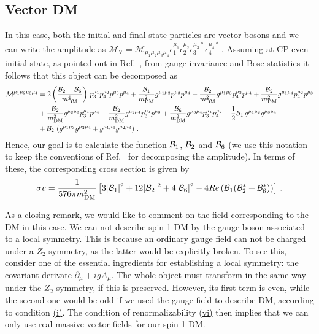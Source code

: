 \subsection{Vector DM}

In this case, both the initial and final state particles are vector bosons and we can write the amplitude as $
\mathcal{M}_\text{V}=\mathcal{M}_{\mu_1\mu_2\mu_3\mu_4} \epsilon^{\mu_1}_1\epsilon^{\mu_2}_2\epsilon^{\mu_3*}_3\epsilon^{\mu_4*}_4 \,.
$
Assuming at CP-even initial state, as pointed out in Ref.~\cite{Bergstrom:2004nr}, from gauge invariance and Bose statistics it follows that this object can be decomposed as 
%
\begin{align}
\mathcal{M}^{\mu_1\mu_2\mu_3\mu_4} &= 2\left(\dfrac{{\cal B}_2-{\cal B}_6 }{m_{\text{DM}}^4}\right)\,p_3^{\mu_1}p_4^{\mu_2}p^{\mu_3}p^{\mu_4}
+\dfrac{{\cal B}_1}{m_{\text{DM}}^2}g^{\mu_1\mu_2}p^{\mu_3}p^{\mu_4}
-\dfrac{{\cal B}_2}{m_{\text{DM}}^2}g^{\mu_1\mu_3}p_4^{\mu_2}p^{\mu_4}
+\dfrac{{\cal B}_2}{m_{\text{DM}}^2}g^{\mu_1\mu_4}p_4^{\mu_2}p^{\mu_3}\nonumber \\
&+\dfrac{{\cal B}_2}{m_{\text{DM}}^2}g^{\mu_2\mu_3}p_3^{\mu_1}p^{\mu_4}
-\dfrac{{\cal B}_2}{m_{\text{DM}}^2}g^{\mu_2\mu_4}p_3^{\mu_1}p^{\mu_3}
+\dfrac{{\cal B}_6}{m_{\text{DM}}^2}g^{\mu_3\mu_4}p_3^{\mu_1}p_4^{\mu_2}-\frac{1}{2}{\cal B}_1 \, g^{\mu_1\mu_2}g^{\mu_3\mu_4}\nonumber \\
&+{\cal B}_2 \,\left( g^{\mu_1\mu_3}g^{\mu_2\mu_4}
+ g^{\mu_1\mu_4}g^{\mu_2\mu_3}\right)\,.
\label{eq:Mvec}
\end{align}
Hence, our goal is to calculate the function ${\cal B}_1$, ${\cal B}_2$ and ${\cal B}_6$ (we use this notation to keep the conventions of Ref.~\cite{Bergstrom:2004nr} for decomposing the amplitude). In terms of these, the corresponding cross section is given by
\begin{equation}
\sigma v= \frac{1}{576 \pi m_{\text{DM}}^2} \left[3|{\cal B}_1|^2+12|{\cal B}_2|^2+4|{\cal B}_6|^2-4 Re\left( {\cal B}_1 ( {\cal B}_2^*+ {\cal B}_6^*)\right)\right]\,.
\end{equation}

As a closing remark, we would like to comment on the field corresponding to the DM in this case. We can not describe spin-1 DM  by the gauge boson associated to a local symmetry. This is because an ordinary gauge field can not be charged under a $Z_2$ symmetry, as the latter would be explicitly broken. To see this, consider one of the essential ingredients for establishing a local symmetry: the covariant derivate $\partial_\mu + i g A_\mu$. The whole object must transform in the same way under the $Z_2$ symmetry, if this is preserved. However, its  first term is even, while the second one would be odd if we used the gauge field to describe DM, according to condition \hyperref[condition:i]{(i)}.  The condition of renormalizability \hyperref[condition:vi]{(vi)} then implies that we can only use real massive vector fields for our spin-1 DM. 











